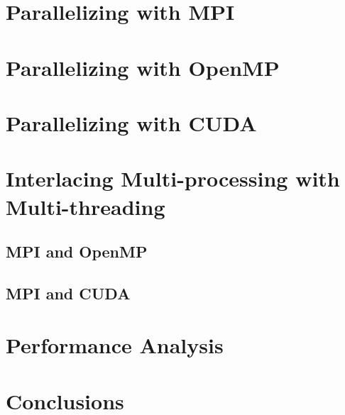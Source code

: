 \documentclass[11pt, journal]{IEEEtran}
\begin{document}
\section{Parallelizing with MPI}

\section{Parallelizing with OpenMP}

\section{Parallelizing with CUDA}

\section{Interlacing Multi-processing with Multi-threading}

\subsection{MPI and OpenMP}
\subsection{MPI and CUDA}

\section{Performance Analysis}

\section{Conclusions}


\end{document}
